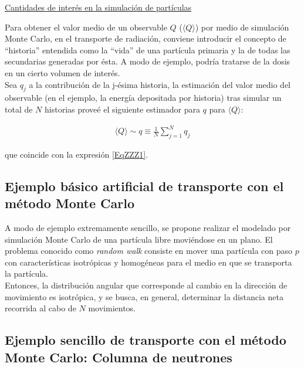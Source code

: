 \begin{center}
\underline{Cantidades de inter\'es en la simulaci\'on de part\'iculas}
\end{center}

Para obtener el valor medio de un observable $Q$ ($ \langle Q \rangle $) por medio de simulaci\'on Monte Carlo, en el transporte de
radiaci\'on, conviene introducir el concepto de ``historia'' entendida como la ``vida'' de una part\'icula primaria y la de todas las
secundarias generadas por \'esta.
%
A modo de ejemplo, podr\'ia tratarse de la dosis en un cierto volumen de inter\'es. \\
%
%
Sea $q_{j}$ a la contribuci\'on de la j-\'esima historia, la estimaci\'on del valor medio del observable (en el ejemplo, la energ\'ia
depositada por historia) tras simular un total de $N$ historias prove\'e el siguiente estimador para $q$ para $\langle Q \rangle$:

\begin{eqnarray}
 	\langle Q \rangle \sim q \equiv \frac{1}{N} \sum_{j=1} ^{N} q_{j}
 \label{EqZZZ24}
\end{eqnarray}

que coincide con la expresi\'on \ref{EqZZZ1}. \\
%
%


\subsection{Ejemplo b\'asico artificial de transporte con el m\'etodo Monte Carlo}
\label{CapVII_12}


A modo de ejemplo extremamente sencillo, se propone realizar el modelado por simulaci\'on Monte Carlo de una part\'icula libre movi\'endose
en un plano.
%
El problema conocido como \textit{random walk} consiste en mover una part\'icula con paso $p$ con caracter\'isticas isotr\'opicas y
homog\'eneas para el medio en que se transporta la part\'icula. \\
%
%
Entonces, la distribuci\'on angular que corresponde al cambio en la direcci\'on de movimiento es isotr\'opica, y se busca, en general,
determinar la distancia neta recorrida al cabo de $N$ movimientos. \\
%
%

\subsection{Ejemplo sencillo de transporte con el m\'etodo Monte Carlo: Columna de neutrones}
\label{CapVII_13}

